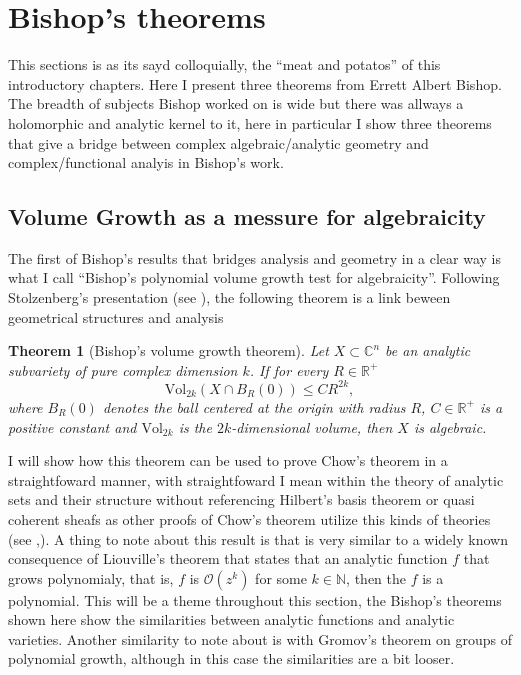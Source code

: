 \documentclass[12pt,twoside,a4paper]{report}
\newtheorem{theorem}{Theorem}[section]
\newcommand{\nat}{\ensuremath{ \mathbb N }}
\newcommand{\re}{\ensuremath{\mathbb R }}
\newcommand{\con}{\ensuremath{\mathbb{C}^n}}
\newcommand{\osheaf}{\ensuremath{\mathcal O }}
\begin{document}
\section{Bishop's theorems}
\noindent This sections is as its sayd colloquially, the ``meat and potatos'' of this introductory chapters. Here I present three theorems from Errett Albert Bishop. The breadth of subjects Bishop worked on is wide but there was allways a holomorphic and analytic kernel to it, here in particular I show three theorems that give a bridge between complex algebraic/analytic geometry and complex/functional analyis in Bishop's work.  
\subsection{Volume Growth as a messure for algebraicity}

\noindent The first of Bishop's results that bridges analysis and geometry in a clear way is what I call ``Bishop's polynomial volume growth test for algebraicity''. Following Stolzenberg's presentation (see \cite{Stolzenberg}), the following theorem is a link beween geometrical structures and analysis
\begin{theorem}[Bishop's volume growth theorem]\label{Bishop1}
        Let $X\subset\con$ be an analytic subvariety of pure complex dimension $k$. If for every $R\in\re^+$
        \[
          \textrm{Vol}_{2k}(X\cap B_R(0))\leq CR^{2k},
        \]
        where $B_R(0)$ denotes the ball centered at the origin with radius $R$, $C\in\re^{+}$ is a positive constant
        and $\textrm{Vol}_{2k}$ is the $2k$-dimensional volume, then $X$ is algebraic.
\end{theorem}

I will show how this theorem can be used to prove Chow's theorem in a straightfoward manner, with straightfoward I mean within the theory of analytic sets and their structure without referencing Hilbert's basis theorem or quasi coherent sheafs as other proofs of Chow's theorem utilize this kinds of theories (see \cite{GAGA},\cite{chow-proofs}). A thing to note about this result is that is very similar to a widely known consequence of Liouville's theorem that states that an analytic function $f$ that grows polynomialy, that is, $f$ is $\osheaf(z^{k})$ for some $k\in\nat$, then the $f$ is a polynomial. This will be a theme throughout this section, the Bishop's theorems shown here show the similarities between analytic functions and analytic varieties. Another similarity to note about is with Gromov's theorem on groups of polynomial growth, although in this case the similarities are a bit looser.
\end{document}
